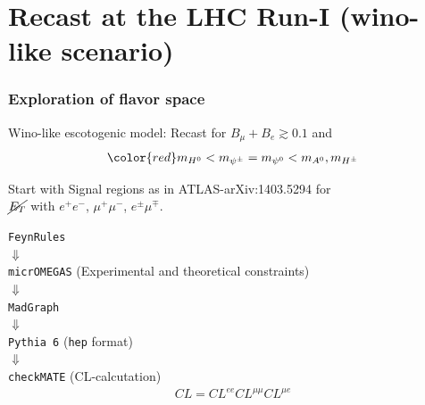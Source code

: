 \documentclass[%
xcolor=dvipsnames,table%
]{beamer}
\begin{document}
\section{Recast at the LHC Run-I (wino-like scenario)}
\begin{frame}
  \frametitle{Exploration of flavor space}
\alert{Wino-like escotogenic model}: Recast for \alert{$B_{\mu}+B_e \gtrsim 0.1$} and
\begin{align*}
\color{red}  m_{H^0}<m_{\psi^{\pm}}= m_{\psi^{0}}<m_{A^0},m_{H^{\pm}}
\end{align*}

\vspace{-0.3cm}

Start with Signal regions as in ATLAS-arXiv:1403.5294 for\\


 $\cancel{E_T}$ with $e^+ e^-$, $\mu^+\mu^-$,
 $e^{\pm}\mu^{\mp}$. 

\centering
\texttt{FeynRules} \\
$\Downarrow$\\
\texttt{micrOMEGAS} (Experimental and theoretical constraints) \\
$\Downarrow$\\
\texttt{MadGraph}\\
$\Downarrow$\\
\texttt{Pythia 6} (\texttt{hep} format)\\ 
$\Downarrow$\\
\texttt{checkMATE} (CL-calcutation)
\begin{align*}
  CL=CL^{ee}CL^{\mu\mu}CL^{\mu e}
\end{align*}
\end{frame}
\end{document}
